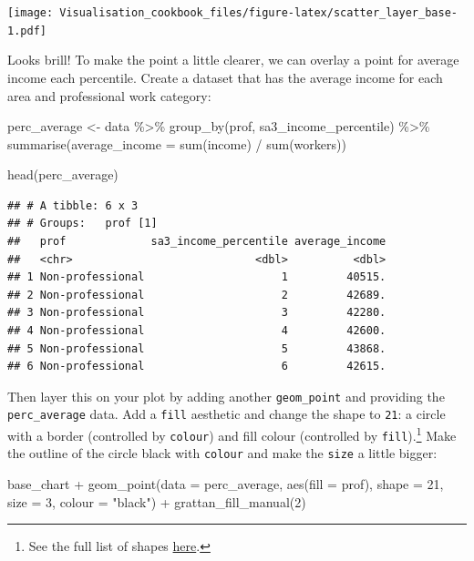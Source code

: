 \documentclass[
]{book}
\newenvironment{Shaded}{\begin{snugshade}}{\end{snugshade}}
\newcommand{\AttributeTok}[1]{\textcolor[rgb]{0.77,0.63,0.00}{#1}}
\newcommand{\DecValTok}[1]{\textcolor[rgb]{0.00,0.00,0.81}{#1}}
\newcommand{\FunctionTok}[1]{\textcolor[rgb]{0.00,0.00,0.00}{#1}}
\newcommand{\NormalTok}[1]{#1}
\newcommand{\OtherTok}[1]{\textcolor[rgb]{0.56,0.35,0.01}{#1}}
\newcommand{\SpecialCharTok}[1]{\textcolor[rgb]{0.00,0.00,0.00}{#1}}
\newcommand{\StringTok}[1]{\textcolor[rgb]{0.31,0.60,0.02}{#1}}
\begin{document}
\texttt{[image: Visualisation\_cookbook\_files/figure-latex/scatter\_layer\_base-1.pdf]}

Looks brill! To make the point a little clearer, we can overlay a point for average income each percentile. Create a dataset that has the average income for each area and professional work category:

\begin{Shaded}
\begin{Highlighting}[]
\NormalTok{perc\_average }\OtherTok{\textless{}{-}}\NormalTok{ data }\SpecialCharTok{\%\textgreater{}\%} 
  \FunctionTok{group\_by}\NormalTok{(prof, sa3\_income\_percentile) }\SpecialCharTok{\%\textgreater{}\%} 
  \FunctionTok{summarise}\NormalTok{(}\AttributeTok{average\_income =} \FunctionTok{sum}\NormalTok{(income) }\SpecialCharTok{/} \FunctionTok{sum}\NormalTok{(workers))}

\FunctionTok{head}\NormalTok{(perc\_average)}
\end{Highlighting}
\end{Shaded}

\begin{verbatim}
## # A tibble: 6 x 3
## # Groups:   prof [1]
##   prof             sa3_income_percentile average_income
##   <chr>                            <dbl>          <dbl>
## 1 Non-professional                     1         40515.
## 2 Non-professional                     2         42689.
## 3 Non-professional                     3         42280.
## 4 Non-professional                     4         42600.
## 5 Non-professional                     5         43868.
## 6 Non-professional                     6         42615.
\end{verbatim}

Then layer this on your plot by adding another \texttt{geom\_point} and providing the \texttt{perc\_average} data. Add a \texttt{fill} aesthetic and change the shape to \texttt{21}: a circle with a border (controlled by \texttt{colour}) and fill colour (controlled by \texttt{fill}).\footnote{See the full list of shapes \href{https://ggplot2.tidyverse.org/reference/scale_shape.html}{here}.}
Make the outline of the circle black with \texttt{colour} and make the \texttt{size} a little bigger:

\begin{Shaded}
\begin{Highlighting}[]
\NormalTok{base\_chart }\SpecialCharTok{+}
  \FunctionTok{geom\_point}\NormalTok{(}\AttributeTok{data =}\NormalTok{ perc\_average,}
             \FunctionTok{aes}\NormalTok{(}\AttributeTok{fill =}\NormalTok{ prof),}
             \AttributeTok{shape =} \DecValTok{21}\NormalTok{,}
             \AttributeTok{size =} \DecValTok{3}\NormalTok{, }
             \AttributeTok{colour =} \StringTok{"black"}\NormalTok{) }\SpecialCharTok{+} 
  \FunctionTok{grattan\_fill\_manual}\NormalTok{(}\DecValTok{2}\NormalTok{)}
\end{Highlighting}
\end{Shaded}
\end{document}
